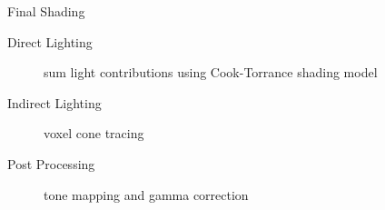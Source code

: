 \documentclass[10pt]{beamer}
\begin{document}



\begin{frame}{Final Shading}
  \begin{description}
    \item[Direct Lighting] sum light contributions using Cook-Torrance shading model
    \item[Indirect Lighting] voxel cone tracing
    \item[Post Processing] tone mapping and gamma correction
  \end{description}
\end{frame}
\end{document}
